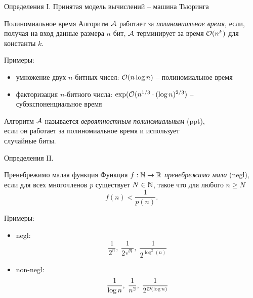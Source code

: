 \documentclass[usenames,dvipsnames,8pt,aspectratio=169]{beamer}
\begin{document}
\begin{frame}{Определения I.}
\Large 
Принятая модель вычислений -- машина Тьюринга \\
\begin{block}{Полиномиальное время}
	Алгоритм $\mathcal{A}$ работает за \emph{полиномиальное время}, если, получая на вход данные размера  $n$ бит,  $\mathcal{A}$ терминирует за время $\mathcal{O}(n^k)$ для константы $k$.
\end{block}
\vspace{10pt}
Примеры: 
\begin{itemize}
	\LARGE
	\item умножение двух $n$-битных чисел: $\mathcal{O}(n \log n)$ -- полиномиальное время
	\item факторизация $n$-битного числа: $\exp(\mathcal{O}(n^{1/3}\cdot (\log n)^{2/3})$ -- субэкспоненциальное время
\end{itemize}
\vspace{10pt}
\Large

Алгоритм $\mathcal{A}$ называется \emph{вероятностным полиномиальным} (ppt), \\ если он работает за полиномиальное время и использует \\ случайные биты.

\end{frame}


\begin{frame} {Определения II.}
\Large
\begin{block}{Пренебрежимо малая функция}
Функция $f: {{\mathbb N}} \rightarrow {{\mathbb R}}$ \emph{пренебрежимо мала} (negl), если для всех многочленов $p$ существует $N \in {{\mathbb N}}$, такое что для любого $n \geq N$
\[
f(n) < \frac{1}{p(n)}.
\]
\end{block}

\vspace{10pt}
Примеры: 
\begin{itemize}
\LARGE
\item negl:
\[
\frac{1}{2^n}, \; \frac{1}{2^{\sqrt{n}}}, \;  \frac{1}{2^{\log^2(n)}}
\]
\item non-negl:
\[
\frac{1}{\log n}, \;  \frac{1}{n^2}, \;  \frac{1}{2^{\mathcal{O}(\log n)}} 
\]
\end{itemize}
\end{frame}
\end{document}
